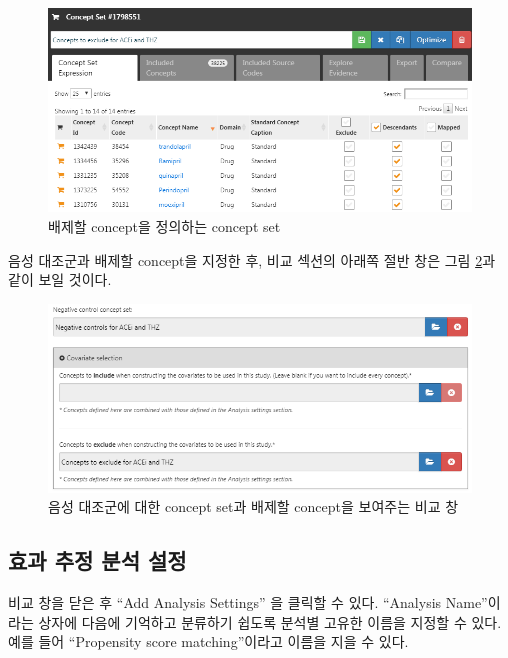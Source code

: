 \documentclass[10.5pt]{book}
\theoremstyle{definition}
\theoremstyle{definition}
\theoremstyle{definition}
\theoremstyle{remark}
\begin{document}
\begin{figure}

{\centering \includegraphics[width=1\linewidth]{images/PopulationLevelEstimation/covsToExclude} 

}

\caption{배제할 concept을 정의하는 concept set}\label{fig:covsToExclude}
\end{figure}

음성 대조군과 배제할 concept을 지정한 후, 비교 섹션의 아래쪽 절반 창은
그림 \ref{fig:comparisons2}과 같이 보일 것이다.

\begin{figure}

{\centering \includegraphics[width=1\linewidth]{images/PopulationLevelEstimation/comparisons2} 

}

\caption{음성 대조군에 대한 concept set과 배제할 concept을 보여주는 비교 창}\label{fig:comparisons2}
\end{figure}

\subsection{효과 추정 분석 설정}\label{---}

비교 창을 닫은 후 ``Add Analysis Settings'' 을 클릭할 수 있다.
``Analysis Name''이라는 상자에 다음에 기억하고 분류하기 쉽도록 분석별
고유한 이름을 지정할 수 있다. 예를 들어 ``Propensity score
matching''이라고 이름을 지을 수 있다.
\end{document}
